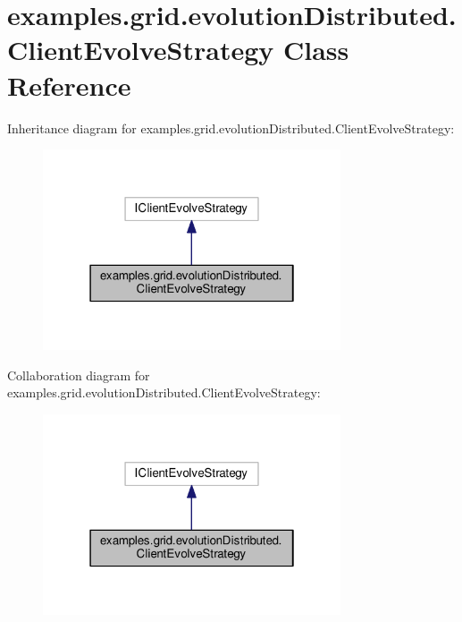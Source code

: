 \hypertarget{classexamples_1_1grid_1_1evolution_distributed_1_1_client_evolve_strategy}{\section{examples.\-grid.\-evolution\-Distributed.\-Client\-Evolve\-Strategy Class Reference}
\label{classexamples_1_1grid_1_1evolution_distributed_1_1_client_evolve_strategy}
}


Inheritance diagram for examples.\-grid.\-evolution\-Distributed.\-Client\-Evolve\-Strategy\-:
\nopagebreak
\begin{figure}[H]
\begin{center}
\leavevmode
\includegraphics[width=250pt]{classexamples_1_1grid_1_1evolution_distributed_1_1_client_evolve_strategy__inherit__graph}
\end{center}
\end{figure}


Collaboration diagram for examples.\-grid.\-evolution\-Distributed.\-Client\-Evolve\-Strategy\-:
\nopagebreak
\begin{figure}[H]
\begin{center}
\leavevmode
\includegraphics[width=250pt]{classexamples_1_1grid_1_1evolution_distributed_1_1_client_evolve_strategy__coll__graph}
\end{center}
\end{figure}
